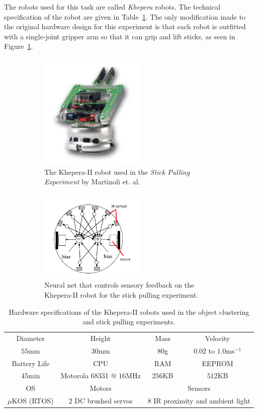 \documentclass[Main.tex]{subfiles}
\begin{document}
The robots used for this task are called \emph{Khepera} robots. The technical specification of the robot are given in Table~\ref{tab:khepera}. The only modification made to the original hardware design for this experiment is that each robot is outfitted with a single-joint gripper arm so that it can grip and lift sticks, as seen in Figure~\ref{fig:khepbot}.

\begin{figure}[!htb]
\centering 
\begin{subfigure}[b]{6.5cm}
\includegraphics[width=5cm]{khepera2robot.png}
\centering\caption{The Khepera-II robot used in the \emph{Stick Pulling Experiment} by Martinoli et. al.}\label{fig:khepbot}
\end{subfigure}
\qquad\centering
\begin{subfigure}[b]{6.5cm}
\includegraphics[width=5cm]{kheperascem.png}
\centering\caption{Neural net that controls sensory feedback on the Khepera-II robot for the stick pulling experiment.}\label{fig:khepschem}
\end{subfigure}
\caption{}\label{fig:kheperastick}
\end{figure}

\begin{table}[htb]
\centering\begin{tabular}{|*{4}{c|}}
\hline
Diameter & Height & Mass & Velocity \\
$55$mm & $30$mm & $80$g & $0.02$ to $1.0$ms$^{-1}$ \\ \hline
Battery Life & CPU & RAM & EEPROM \\
45min & Motorola 68331 @ $16$MHz & $256$KB & $512$KB \\ \hline
OS & Motors & \multicolumn{2}{c|}{Sensors}\\
$\mu$KOS (RTOS) & 2 DC brushed servos & \multicolumn{2}{c|}{8 IR proximity and ambient light}\\
\hline
\end{tabular}
\caption{Hardware specifications of the Khepera-II robots used in the object clustering and stick pulling experiments.}\label{tab:khepera}
\end{table}
\end{document}
